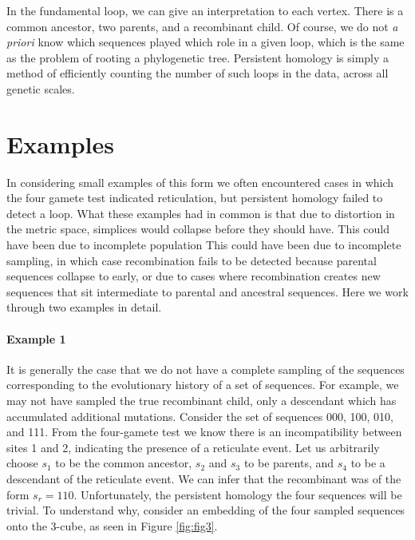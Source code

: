 In the fundamental loop, we can give an interpretation to each vertex.
There is a common ancestor, two parents, and a recombinant child.
Of course, we do not \emph{a priori} know which sequences played which role in a given loop, which is the same as the problem of rooting a phylogenetic tree.
Persistent homology is simply a method of efficiently counting the number of such loops in the data, across all genetic scales.

\section{Examples}
\label{sec:examples}

In considering small examples of this form we often encountered cases in which the four gamete test indicated reticulation, but persistent homology failed to detect a loop.
What these examples had in common is that due to distortion in the metric space, simplices would collapse before they should have.
This could have been due to incomplete population
This could have been due to incomplete sampling, in which case recombination fails to be detected because parental sequences collapse to early, or due to cases where recombination creates new sequences that sit intermediate to parental and ancestral sequences.
Here we work through two examples in detail.

\paragraph{Example 1}
\label{ex:example1}
%
It is generally the case that we do not have a complete sampling of the sequences corresponding to the evolutionary history of a set of sequences.
For example, we may not have sampled the true recombinant child, only a descendant which has accumulated additional mutations.
Consider the set of sequences 000, 100, 010, and 111.
From the four-gamete test we know there is an incompatibility between sites 1 and 2, indicating the presence of a reticulate event.
Let us arbitrarily choose $s_1$ to be the common ancestor, $s_2$ and $s_3$ to be parents, and $s_4$ to be a descendant of the reticulate event.
We can infer that the recombinant was of the form $s_r=110$.
Unfortunately, the persistent homology the four sequences will be trivial.
To understand why, consider an embedding of the four sampled sequences onto the 3-cube, as seen in Figure \ref{fig:fig3}.

